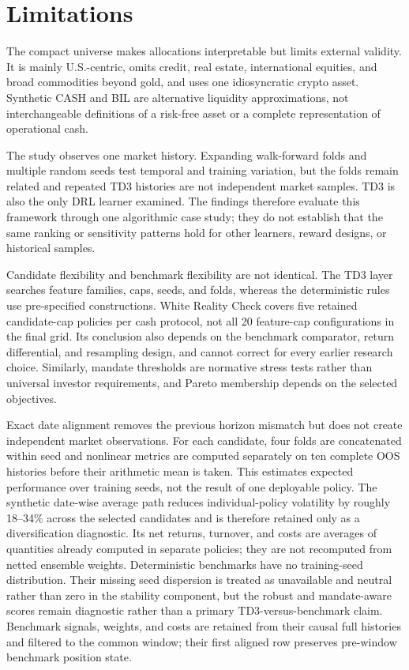 \documentclass[11pt]{article}
\begin{document}
\section{Limitations}

The compact universe makes allocations interpretable but limits external validity. It is mainly U.S.-centric, omits credit, real estate, international equities, and broad commodities beyond gold, and uses one idiosyncratic crypto asset. Synthetic CASH and BIL are alternative liquidity approximations, not interchangeable definitions of a risk-free asset or a complete representation of operational cash.

The study observes one market history. Expanding walk-forward folds and multiple random seeds test temporal and training variation, but the folds remain related and repeated TD3 histories are not independent market samples. TD3 is also the only DRL learner examined. The findings therefore evaluate this framework through one algorithmic case study; they do not establish that the same ranking or sensitivity patterns hold for other learners, reward designs, or historical samples.

Candidate flexibility and benchmark flexibility are not identical. The TD3 layer searches feature families, caps, seeds, and folds, whereas the deterministic rules use pre-specified constructions. White Reality Check covers five retained candidate-cap policies per cash protocol, not all 20 feature-cap configurations in the final grid. Its conclusion also depends on the benchmark comparator, return differential, and resampling design, and cannot correct for every earlier research choice. Similarly, mandate thresholds are normative stress tests rather than universal investor requirements, and Pareto membership depends on the selected objectives.

Exact date alignment removes the previous horizon mismatch but does not create independent market observations. For each candidate, four folds are concatenated within seed and nonlinear metrics are computed separately on ten complete OOS histories before their arithmetic mean is taken. This estimates expected performance over training seeds, not the result of one deployable policy. The synthetic date-wise average path reduces individual-policy volatility by roughly 18--34\% across the selected candidates and is therefore retained only as a diversification diagnostic. Its net returns, turnover, and costs are averages of quantities already computed in separate policies; they are not recomputed from netted ensemble weights. Deterministic benchmarks have no training-seed distribution. Their missing seed dispersion is treated as unavailable and neutral rather than zero in the stability component, but the robust and mandate-aware scores remain diagnostic rather than a primary TD3-versus-benchmark claim. Benchmark signals, weights, and costs are retained from their causal full histories and filtered to the common window; their first aligned row preserves pre-window benchmark position state.
\end{document}
